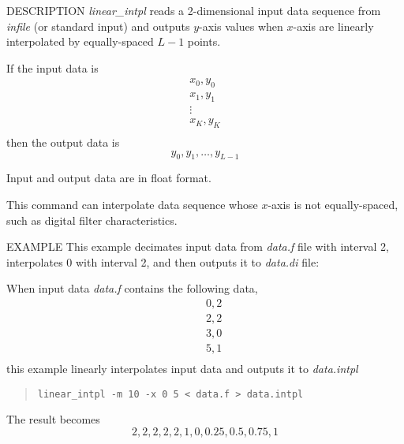 \begin{qsection}{DESCRIPTION}
{\em linear\_intpl} reads a 2-dimensional input data sequence
from {\em infile} (or standard input) and outputs $y$-axis values
when $x$-axis are linearly interpolated by equally-spaced $L-1$ points.

If the input data is
\begin{displaymath}
   \begin{matrix}
	x_0, y_0 \\
	x_1, y_1 \\
	\vdots   \\
	x_K, y_K \\
	\end{matrix}
\end{displaymath}
then the output data is
\begin{displaymath}
y_0, y_1, \dots, y_{L-1}
\end{displaymath}

\par
Input and output data are in float format.
\par
This command can interpolate data sequence whose $x$-axis is not equally-spaced,
such as digital filter characteristics.

\end{qsection}

\begin{options}
\end{options}

\begin{qsection}{EXAMPLE}
This example decimates input data from {\em data.f} file with interval 2,
interpolates 0 with interval 2, and then outputs it to {\em
data.di} file:

When input data {\em data.f} contains the following data,
\begin{eqnarray*}
&& 0, 2 \nonumber \\
&& 2, 2 \nonumber \\
&& 3, 0   \\
&& 5, 1 \nonumber \\
\end{eqnarray*}
this example linearly interpolates input data and outputs it to {\em data.intpl}
\begin{quote}
 \verb!linear_intpl -m 10 -x 0 5 < data.f > data.intpl!
\end{quote}
The result becomes
\begin{displaymath}
2, 2, 2, 2, 2, 1, 0, 0.25, 0.5, 0.75, 1
\end{displaymath}
\end{qsection}
% 
